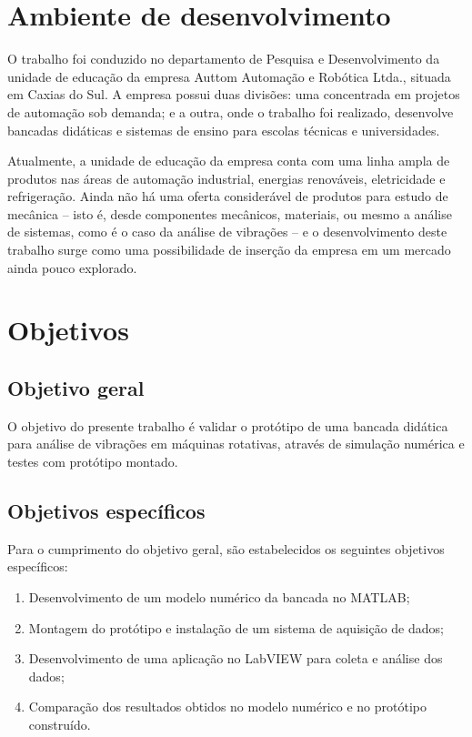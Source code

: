 \documentclass[12pt,openright,oneside,a4paper,
	chapter=TITLE,section=TITLE,
	english,brazil]{abntex2}
\begin{document}
	\section{Ambiente de desenvolvimento}	
	O trabalho foi conduzido no departamento de Pesquisa e Desenvolvimento da unidade de educação da empresa Auttom Automação e Robótica Ltda., situada em Caxias do Sul. A empresa possui duas divisões: uma concentrada em projetos de automação sob demanda; e a outra, onde o trabalho foi realizado, desenvolve bancadas didáticas e sistemas de ensino para escolas técnicas e universidades.
	
	Atualmente, a unidade de educação da empresa conta com uma linha ampla de produtos nas áreas de automação industrial, energias renováveis, eletricidade e refrigeração. Ainda não há uma oferta considerável de produtos para estudo de mecânica -- isto é, desde componentes mecânicos, materiais, ou mesmo a análise de sistemas, como é o caso da análise de vibrações -- e o desenvolvimento deste trabalho surge como uma possibilidade de inserção da empresa em um mercado ainda pouco explorado.
	
	\section{Objetivos}
	
	\subsection{Objetivo geral}
	O objetivo do presente trabalho é validar o protótipo de uma bancada didática para análise de vibrações em máquinas rotativas, através de simulação numérica e testes com protótipo montado.
	
	\subsection{Objetivos específicos}
	Para o cumprimento do objetivo geral, são estabelecidos os seguintes objetivos específicos:
	\begin{enumerate}
		\setlength{\itemsep}{0pt plus 2pt minus 1pt}
		\item Desenvolvimento de um modelo numérico da bancada no MATLAB\textsuperscript{\textregistered};
		\item Montagem do protótipo e instalação de um sistema de aquisição de dados;
		\item Desenvolvimento de uma aplicação no LabVIEW\textsuperscript{\textregistered} para coleta e análise dos dados;
		\item Comparação dos resultados obtidos no modelo numérico e no protótipo construído.
	\end{enumerate}
\end{document}
